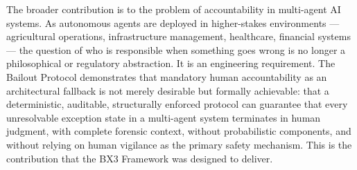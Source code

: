 The broader contribution is to the problem of accountability in multi-agent AI systems. As autonomous agents are deployed in higher-stakes environments --- agricultural operations, infrastructure management, healthcare, financial systems --- the question of who is responsible when something goes wrong is no longer a philosophical or regulatory abstraction. It is an engineering requirement. The Bailout Protocol demonstrates that mandatory human accountability as an architectural fallback is not merely desirable but formally achievable: that a deterministic, auditable, structurally enforced protocol can guarantee that every unresolvable exception state in a multi-agent system terminates in human judgment, with complete forensic context, without probabilistic components, and without relying on human vigilance as the primary safety mechanism. This is the contribution that the BX3 Framework was designed to deliver.
